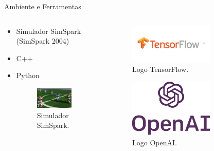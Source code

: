 \documentclass{beamer}
\begin{document}
\begin{frame}{Ambiente e Ferramentas}
\begin{columns}[T] %
\begin{column}{.5\textwidth}
 \begin{itemize}
 \setlength\itemsep{1em}
  \item Simulador SimSpark (SimSpark 2004)
  \item C++
  \item Python
  \begin{figure}[h!]
   \centering
       \includegraphics[width=0.8\textwidth]{figures/simspark.png}
 \caption{Simulador SimSpark.}
\end{figure}
 \end{itemize}
\end{column}
\begin{column}{.5\textwidth}
  
  \begin{figure}[h!]
   \centering
       \includegraphics[width=0.7\textwidth]{figures/tensorflow.png}
 \caption{Logo TensorFlow.}
\end{figure}
  \begin{figure}[h!]
   \centering
       \includegraphics[width=0.7\textwidth]{figures/openai.png}
 \caption{Logo OpenAI.}
\end{figure}
\end{column}
\end{columns}
\end{frame}
\end{document}
